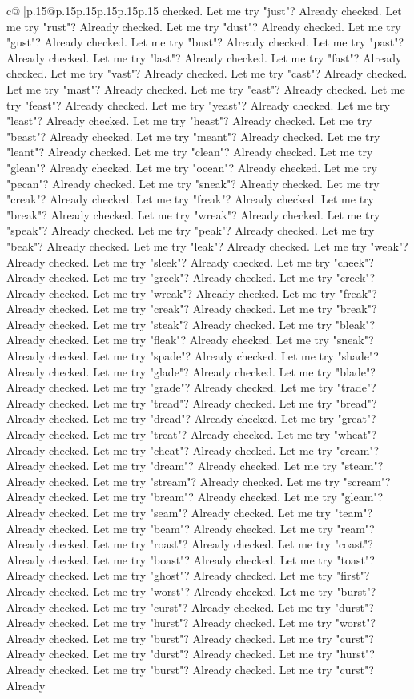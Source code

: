 \documentclass{article}
\begin{document}
{\begin{supertabular}{c@{$\;$}|p{.15\linewidth}@{}p{.15\linewidth}p{.15\linewidth}p{.15\linewidth}p{.15\linewidth}p{.15\linewidth}}
{{{checked. Let me try "just"? Already checked. Let me try "rust"? Already checked. Let me try "dust"? Already checked. Let me try "gust"? Already checked. Let me try "bust"? Already checked. Let me try "past"? Already checked. Let me try "last"? Already checked. Let me try "fast"? Already checked. Let me try "vast"? Already checked. Let me try "cast"? Already checked. Let me try "mast"? Already checked. Let me try "east"? Already checked. Let me try "feast"? Already checked. Let me try "yeast"? Already checked. Let me try "least"? Already checked. Let me try "heast"? Already checked. Let me try "beast"? Already checked. Let me try "meant"? Already checked. Let me try "leant"? Already checked. Let me try "clean"? Already checked. Let me try "glean"? Already checked. Let me try "ocean"? Already checked. Let me try "pecan"? Already checked. Let me try "sneak"? Already checked. Let me try "creak"? Already checked. Let me try "freak"? Already checked. Let me try "break"? Already checked. Let me try "wreak"? Already checked. Let me try "speak"? Already checked. Let me try "peak"? Already checked. Let me try "beak"? Already checked. Let me try "leak"? Already checked. Let me try "weak"? Already checked. Let me try "sleek"? Already checked. Let me try "cheek"? Already checked. Let me try "greek"? Already checked. Let me try "creek"? Already checked. Let me try "wreak"? Already checked. Let me try "freak"? Already checked. Let me try "creak"? Already checked. Let me try "break"? Already checked. Let me try "steak"? Already checked. Let me try "bleak"? Already checked. Let me try "fleak"? Already checked. Let me try "sneak"? Already checked. Let me try "spade"? Already checked. Let me try "shade"? Already checked. Let me try "glade"? Already checked. Let me try "blade"? Already checked. Let me try "grade"? Already checked. Let me try "trade"? Already checked. Let me try "tread"? Already checked. Let me try "bread"? Already checked. Let me try "dread"? Already checked. Let me try "great"? Already checked. Let me try "treat"? Already checked. Let me try "wheat"? Already checked. Let me try "cheat"? Already checked. Let me try "cream"? Already checked. Let me try "dream"? Already checked. Let me try "steam"? Already checked. Let me try "stream"? Already checked. Let me try "scream"? Already checked. Let me try "bream"? Already checked. Let me try "gleam"? Already checked. Let me try "seam"? Already checked. Let me try "team"? Already checked. Let me try "beam"? Already checked. Let me try "ream"? Already checked. Let me try "roast"? Already checked. Let me try "coast"? Already checked. Let me try "boast"? Already checked. Let me try "toast"? Already checked. Let me try "ghost"? Already checked. Let me try "first"? Already checked. Let me try "worst"? Already checked. Let me try "burst"? Already checked. Let me try "curst"? Already checked. Let me try "durst"? Already checked. Let me try "hurst"? Already checked. Let me try "worst"? Already checked. Let me try "burst"? Already checked. Let me try "curst"? Already checked. Let me try "durst"? Already checked. Let me try "hurst"? Already checked. Let me try "burst"? Already checked. Let me try "curst"? Already }}}
\end{supertabular}}
\end{document}
